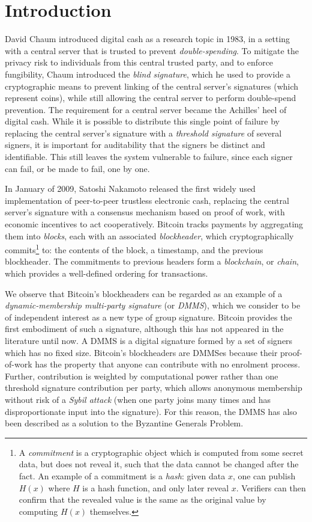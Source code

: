 \documentclass[letterpaper]{article}
\newcommand{\hashsig}{DMMS\xspace}
\newcommand{\hashsigs}{DMMSes\xspace}
\begin{document}
\section{Introduction}


David Chaum introduced digital cash as a research topic in 1983, in a setting with
a central server that is trusted to prevent \emph{double-spending}\cite{chaum1983}.
To mitigate the privacy risk to individuals from this central trusted party, and
to enforce fungibility, Chaum introduced the  \emph{blind signature}, which he
used to provide a cryptographic means to prevent linking of the central server's
signatures (which represent coins), while still allowing the central server to
perform double-spend prevention. The requirement for a central server became
the Achilles' heel of digital cash\cite{grigg1999}. While it is possible to
distribute this single point of failure by replacing the central server's
signature with a \emph{threshold signature} of several signers, it is important
for auditability that the signers be distinct and identifiable. This still
leaves the system vulnerable to failure, since each signer can fail, or be
made to fail, one by one.

In January of 2009, Satoshi Nakamoto released the first widely used implementation
of peer-to-peer trustless electronic cash\cite{nakamoto2009}, replacing the central
server's signature with a consensus mechanism based on proof of work\cite{back2002}, with economic
incentives to act cooperatively. Bitcoin tracks payments by aggregating them into
\emph{blocks}, each with an associated \emph{blockheader}, which cryptographically
commits\footnote{A \emph{commitment} is a cryptographic object which is computed
from some secret data, but does not reveal it, such that the data cannot be changed
after the fact. An example of a commitment is a \emph{hash}: given data $x$, one can
publish $H(x)$ where $H$ is a hash function, and only later reveal $x$. Verifiers
can then confirm that the revealed value is the same as the original value by
computing $H(x)$ themselves.} to: the contents of the block, a timestamp, and
the previous blockheader. The commitments to previous headers form a
\emph{blockchain}, or \emph{chain}, which provides a well-defined ordering for transactions.

We observe that Bitcoin's blockheaders can be regarded as an example of a \emph{dynamic-membership
multi-party signature} (or \emph{\hashsig}), which we consider to be of independent
interest as a new type of group signature. Bitcoin provides the first embodiment of
such a  signature, although this has not appeared in the literature until now.  A
\hashsig is a digital  signature formed by a set of signers which has no fixed size.
Bitcoin's blockheaders are \hashsigs because their proof-of-work has the property
that anyone can contribute with no enrolment process. Further, contribution is
weighted by computational power rather than one  threshold signature contribution
per party,  which allows anonymous membership without risk of a \emph{Sybil attack}
(when one party joins many times and has disproportionate input into the signature).
For this reason, the \hashsig has also been described as a solution to the Byzantine
Generals Problem\cite{aspnes+jackson+krishnamurthy2005}.
\end{document}
